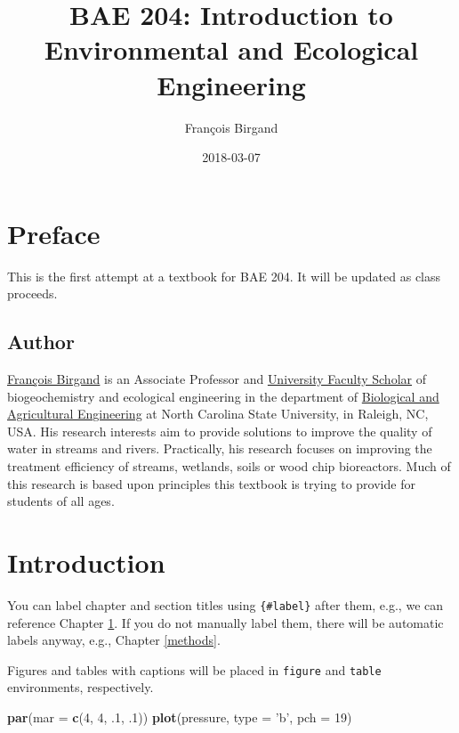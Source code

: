 \documentclass[]{book}
\title{BAE 204: Introduction to Environmental and Ecological Engineering}
\author{François Birgand}
\date{2018-03-07}
\newenvironment{Shaded}{\begin{snugshade}}{\end{snugshade}}
\newcommand{\KeywordTok}[1]{\textcolor[rgb]{0.13,0.29,0.53}{\textbf{#1}}}
\newcommand{\DataTypeTok}[1]{\textcolor[rgb]{0.13,0.29,0.53}{#1}}
\newcommand{\DecValTok}[1]{\textcolor[rgb]{0.00,0.00,0.81}{#1}}
\newcommand{\StringTok}[1]{\textcolor[rgb]{0.31,0.60,0.02}{#1}}
\newcommand{\NormalTok}[1]{#1}
\theoremstyle{definition}
\theoremstyle{definition}
\theoremstyle{definition}
\theoremstyle{remark}
\begin{document}
\maketitle

{
\setcounter{tocdepth}{1}
\tableofcontents
}
\chapter*{Preface}\label{preface}

This is the first attempt at a textbook for BAE 204. It will be updated
as class proceeds.

\section*{Author}\label{author}

\href{https://francoisbirgand.github.io}{François Birgand} is an
Associate Professor and
\href{https://provost.ncsu.edu/strategic-initiatives/university-faculty-scholars/}{University
Faculty Scholar} of biogeochemistry and ecological engineering in the
department of \href{https://www.bae.ncsu.edu/}{Biological and
Agricultural Engineering} at North Carolina State University, in
Raleigh, NC, USA. His research interests aim to provide solutions to
improve the quality of water in streams and rivers. Practically, his
research focuses on improving the treatment efficiency of streams,
wetlands, soils or wood chip bioreactors. Much of this research is based
upon principles this textbook is trying to provide for students of all
ages.

\chapter{Introduction}\label{intro}

You can label chapter and section titles using \texttt{\{\#label\}}
after them, e.g., we can reference Chapter \ref{intro}. If you do not
manually label them, there will be automatic labels anyway, e.g.,
Chapter \ref{methods}.

Figures and tables with captions will be placed in \texttt{figure} and
\texttt{table} environments, respectively.

\begin{Shaded}
\begin{Highlighting}[]
\KeywordTok{par}\NormalTok{(}\DataTypeTok{mar =} \KeywordTok{c}\NormalTok{(}\DecValTok{4}\NormalTok{, }\DecValTok{4}\NormalTok{, .}\DecValTok{1}\NormalTok{, .}\DecValTok{1}\NormalTok{))}
\KeywordTok{plot}\NormalTok{(pressure, }\DataTypeTok{type =} \StringTok{'b'}\NormalTok{, }\DataTypeTok{pch =} \DecValTok{19}\NormalTok{)}
\end{Highlighting}
\end{Shaded}
\end{document}
